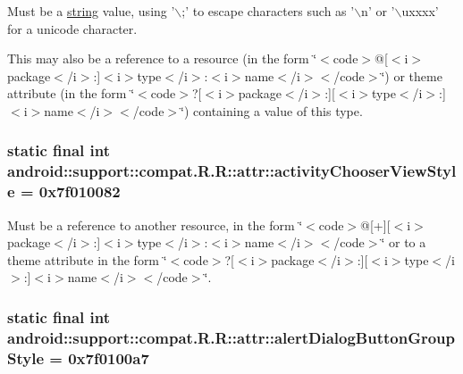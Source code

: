Must be a \hyperlink{classandroid_1_1support_1_1compat_1_1_r_1_1string}{string} value, using '$\backslash$;' to escape characters such as '$\backslash$n' or '$\backslash$uxxxx' for a unicode character. 

This may also be a reference to a resource (in the form \char`\"{}$<$code$>$@\mbox{[}$<$i$>$package$<$/i$>$:\mbox{]}$<$i$>$type$<$/i$>$:$<$i$>$name$<$/i$>$$<$/code$>$\char`\"{}) or theme attribute (in the form \char`\"{}$<$code$>$?\mbox{[}$<$i$>$package$<$/i$>$:\mbox{]}\mbox{[}$<$i$>$type$<$/i$>$:\mbox{]}$<$i$>$name$<$/i$>$$<$/code$>$\char`\"{}) containing a value of this type. \hypertarget{classandroid_1_1support_1_1compat_1_1_r_1_1attr_121d86fae506256f588c4a9a9be3ad8d}{
\subsubsection[{activityChooserViewStyle}]{\setlength{\rightskip}{0pt plus 5cm}static final int android::support::compat.R.R::attr::activityChooserViewStyle = 0x7f010082}}
\label{classandroid_1_1support_1_1compat_1_1_r_1_1attr_121d86fae506256f588c4a9a9be3ad8d}


Must be a reference to another resource, in the form \char`\"{}$<$code$>$@\mbox{[}+\mbox{]}\mbox{[}$<$i$>$package$<$/i$>$:\mbox{]}$<$i$>$type$<$/i$>$:$<$i$>$name$<$/i$>$$<$/code$>$\char`\"{} or to a theme attribute in the form \char`\"{}$<$code$>$?\mbox{[}$<$i$>$package$<$/i$>$:\mbox{]}\mbox{[}$<$i$>$type$<$/i$>$:\mbox{]}$<$i$>$name$<$/i$>$$<$/code$>$\char`\"{}. \hypertarget{classandroid_1_1support_1_1compat_1_1_r_1_1attr_dc774a0f7d41bc16057db3ec37f3c61b}{
\subsubsection[{alertDialogButtonGroupStyle}]{\setlength{\rightskip}{0pt plus 5cm}static final int android::support::compat.R.R::attr::alertDialogButtonGroupStyle = 0x7f0100a7}}
\label{classandroid_1_1support_1_1compat_1_1_r_1_1attr_dc774a0f7d41bc16057db3ec37f3c61b}



